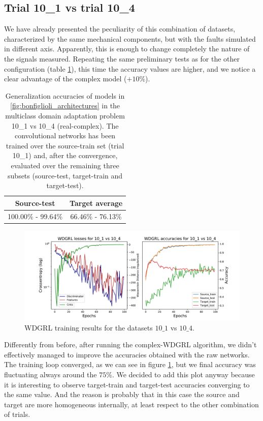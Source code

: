 \documentclass[../main.tex]{subfiles}
\begin{document}
\subsection*{Trial 10\_1 vs trial 10\_4}

We have already presented the peculiarity of this combination of datasets, characterized by the same mechanical components, but with the faults simulated in different axis. Apparently, this is enough to change completely the nature of the signals measured. Repeating the same preliminary tests as for the other configuration (table \ref{tab:bonfiglioli_generalization_101_104}), this time the accuracy values are higher, and we notice a clear advantage of the complex model ($+10\%$).
\begin{table}[!ht]
	\centering
	\begin{tabular}{c | c}
		\toprule
		\textbf{Source-test} & \textbf{Target average}\\
		\midrule
		100.00\% - 99.64\% & 66.46\% - 76.13\% \\
		\bottomrule
	\end{tabular}
	\caption{Generalization accuracies of models in \ref{fig:bonfiglioli_architectures} in the multiclass domain adaptation problem 10\_1 vs 10\_4 (real-complex). The convolutional networks has been trained over the source-train set (trial 10\_1) and, after the convergence, evaluated over the remaining three subsets (source-test, target-train and target-test).}
	\label{tab:bonfiglioli_generalization_101_104}
\end{table}
\begin{figure}[!hb]
	\centering
	\includegraphics[width=\textwidth]{pictures/wdgrl_results_10}
	\caption{WDGRL training results for the datasets $10\_1$ vs $10\_4$.}
	\label{fig:wdgrl_results_10}
\end{figure}
Differently from before, after running the complex-WDGRL algorithm, we didn't effectively managed to improve the accuracies obtained with the raw networks. The training loop converged, as we can see in figure \ref{fig:wdgrl_results_10}, but we final accuracy was fluctuating always around the $75\%$. We decided to add this plot anyway because it is interesting to observe target-train and target-test accuracies converging to the same value. And the reason is probably that in this case the source and target are more homogeneous internally, at least respect to the other combination of trials.
\end{document}
